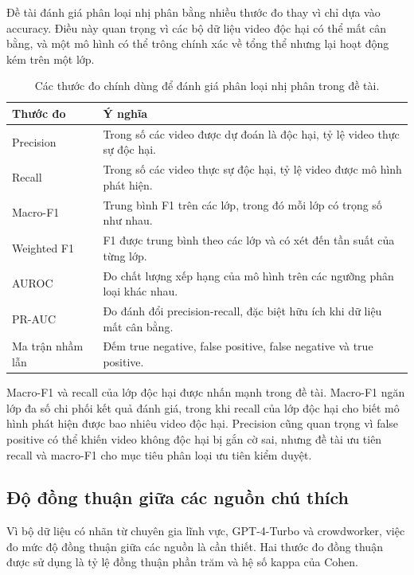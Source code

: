 Đề tài đánh giá phân loại nhị phân bằng nhiều thước đo thay vì chỉ dựa vào accuracy. Điều này quan trọng vì các bộ dữ liệu video độc hại có thể mất cân bằng, và một mô hình có thể trông chính xác về tổng thể nhưng lại hoạt động kém trên một lớp.

\begin{table}[H]
\centering
\renewcommand{\arraystretch}{1.3}
\begin{tabularx}{\textwidth}{|>{\raggedright\arraybackslash}p{3cm}|>{\raggedright\arraybackslash}X|}
\hline
\textbf{Thước đo} & \textbf{Ý nghĩa} \\
\hline
Precision & Trong số các video được dự đoán là độc hại, tỷ lệ video thực sự độc hại. \\
\hline
Recall & Trong số các video thực sự độc hại, tỷ lệ video được mô hình phát hiện. \\
\hline
Macro-F1 & Trung bình F1 trên các lớp, trong đó mỗi lớp có trọng số như nhau. \\
\hline
Weighted F1 & F1 được trung bình theo các lớp và có xét đến tần suất của từng lớp. \\
\hline
AUROC & Đo chất lượng xếp hạng của mô hình trên các ngưỡng phân loại khác nhau. \\
\hline
PR-AUC & Đo đánh đổi precision-recall, đặc biệt hữu ích khi dữ liệu mất cân bằng. \\
\hline
Ma trận nhầm lẫn & Đếm true negative, false positive, false negative và true positive. \\
\hline
\end{tabularx}
\caption{Các thước đo chính dùng để đánh giá phân loại nhị phân trong đề tài.}
\label{tab:theory-evaluation-metrics}
\end{table}

Macro-F1 và recall của lớp độc hại được nhấn mạnh trong đề tài. Macro-F1 ngăn lớp đa số chi phối kết quả đánh giá, trong khi recall của lớp độc hại cho biết mô hình phát hiện được bao nhiêu video độc hại. Precision cũng quan trọng vì false positive có thể khiến video không độc hại bị gắn cờ sai, nhưng đề tài ưu tiên recall và macro-F1 cho mục tiêu phân loại ưu tiên kiểm duyệt.

\subsection{Độ đồng thuận giữa các nguồn chú thích}

Vì bộ dữ liệu có nhãn từ chuyên gia lĩnh vực, GPT-4-Turbo và crowdworker, việc đo mức độ đồng thuận giữa các nguồn là cần thiết. Hai thước đo đồng thuận được sử dụng là tỷ lệ đồng thuận phần trăm và hệ số kappa của Cohen.

